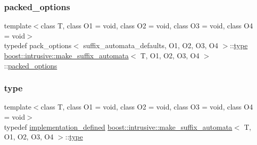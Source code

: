 \subsubsection{\texorpdfstring{packed\+\_\+options}{packed\_options}}
{\footnotesize\ttfamily template$<$class T, class O1 = void, class O2 = void, class O3 = void, class O4 = void$>$ \\
typedef pack\+\_\+options$<$ suffix\+\_\+automata\+\_\+defaults, O1, O2, O3, O4 $>$\+::\hyperlink{structboost_1_1intrusive_1_1make__suffix__automata_a9b173abd26090bafc9d89d6ba31b4165}{type} \hyperlink{structboost_1_1intrusive_1_1make__suffix__automata}{boost\+::intrusive\+::make\+\_\+suffix\+\_\+automata}$<$ T, O1, O2, O3, O4 $>$\+::\hyperlink{structboost_1_1intrusive_1_1make__suffix__automata_a33c2a1d1a4da2d12cb62017e1b8a86ae}{packed\+\_\+options}}

\mbox{\label{structboost_1_1intrusive_1_1make__suffix__automata_a9b173abd26090bafc9d89d6ba31b4165}} 
\subsubsection{\texorpdfstring{type}{type}}
{\footnotesize\ttfamily template$<$class T, class O1 = void, class O2 = void, class O3 = void, class O4 = void$>$ \\
typedef \hyperlink{structboost_1_1intrusive_1_1make__suffix__automata_a7c449bd4e565f9b3bcdea384f96b6bd6}{implementation\+\_\+defined} \hyperlink{structboost_1_1intrusive_1_1make__suffix__automata}{boost\+::intrusive\+::make\+\_\+suffix\+\_\+automata}$<$ T, O1, O2, O3, O4 $>$\+::\hyperlink{structboost_1_1intrusive_1_1make__suffix__automata_a9b173abd26090bafc9d89d6ba31b4165}{type}}

\mbox{\label{structboost_1_1intrusive_1_1make__suffix__automata_a167b4c7e5a6fb43ca4238d252d8e823b}} 
